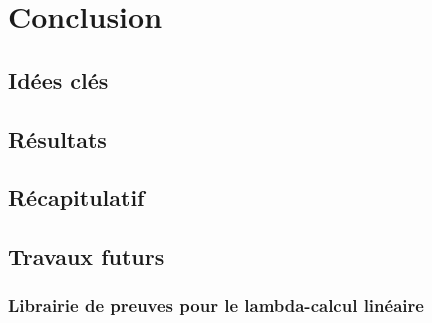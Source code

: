 %
\chapter{Conclusion}
\label{sec::chapitre6}

\section{Idées clés}

\section{Résultats}

\section{Récapitulatif}

\section{Travaux futurs}
\subsection{Librairie de preuves pour le lambda-calcul linéaire}



